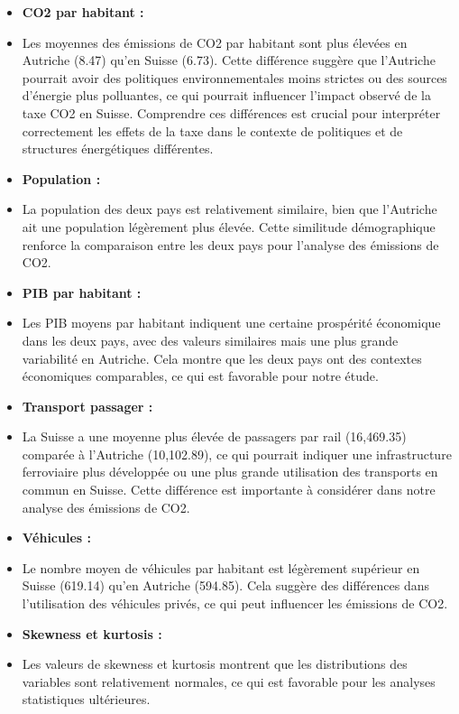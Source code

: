 \begin{itemize}[itemsep=-0.3em]
    \item[] \textbf{CO2 par habitant : }
    \item[] Les moyennes des émissions de CO2 par habitant sont plus élevées en Autriche (8.47) qu'en Suisse (6.73). Cette différence suggère que l'Autriche pourrait avoir des politiques environnementales moins strictes ou des sources d'énergie plus polluantes, ce qui pourrait influencer l'impact observé de la taxe CO2 en Suisse. Comprendre ces différences est crucial pour interpréter correctement les effets de la taxe dans le contexte de politiques et de structures énergétiques différentes.

    \item[] \textbf{Population : }
    \item[] La population des deux pays est relativement similaire, bien que l'Autriche ait une population légèrement plus élevée. Cette similitude démographique renforce la comparaison entre les deux pays pour l'analyse des émissions de CO2.

    \item[] \textbf{PIB par habitant : }
    \item[] Les PIB moyens par habitant indiquent une certaine prospérité économique dans les deux pays, avec des valeurs similaires mais une plus grande variabilité en Autriche. Cela montre que les deux pays ont des contextes économiques comparables, ce qui est favorable pour notre étude.

    \item[] \textbf{Transport passager :}
    \item[] La Suisse a une moyenne plus élevée de passagers par rail (16,469.35) comparée à l'Autriche (10,102.89), ce qui pourrait indiquer une infrastructure ferroviaire plus développée ou une plus grande utilisation des transports en commun en Suisse. Cette différence est importante à considérer dans notre analyse des émissions de CO2.

    \item[] \textbf{Véhicules : }
    \item[] Le nombre moyen de véhicules par habitant est légèrement supérieur en Suisse (619.14) qu'en Autriche (594.85). Cela suggère des différences dans l'utilisation des véhicules privés, ce qui peut influencer les émissions de CO2.

    \item[] \textbf{Skewness et kurtosis : }
    \item[] Les valeurs de skewness et kurtosis montrent que les distributions des variables sont relativement normales, ce qui est favorable pour les analyses statistiques ultérieures.
\end{itemize}

